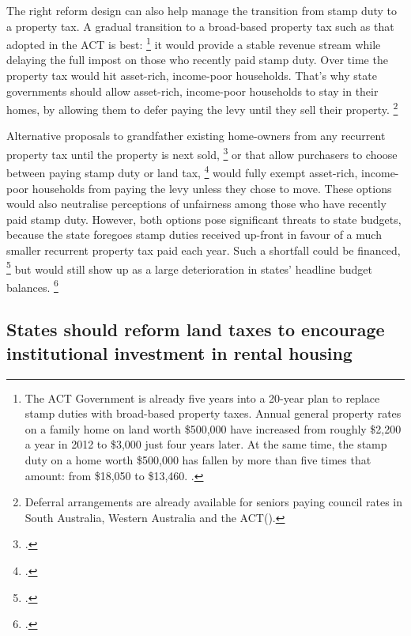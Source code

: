 The right reform design can also help manage the transition from stamp duty to a property tax.
A gradual transition to a broad-based property tax such as that adopted in the ACT is best:%
    \footnote{The ACT Government is already five years into a 20-year plan to replace stamp duties with broad-based property taxes.
    Annual general property rates on a family home on land worth \$500,000 have increased from roughly \$2,200 a year in 2012 to \$3,000 just four years later.
    At the same time, the stamp duty on a home worth \$500,000 has fallen by more than five times that amount: from \$18,050 to \$13,460. \textcite{DaleyCoates-2016-AFR-Following-ACT-landtax-boosts-growth}.}
it would provide a stable revenue stream while delaying the full impost on those who recently paid stamp duty.
Over time the property tax would hit asset-rich, income-poor households.
That's why state governments should allow asset-rich, income-poor households to stay in their homes, by allowing them to defer paying the levy until they sell their property.%
	\footnote{Deferral arrangements are already available for seniors paying council rates in South Australia, Western Australia and the ACT\@ (\textcite[][20]{DaleyCoates-2015-Property-taxes}).} 

Alternative proposals to grandfather existing home-owners from any recurrent property tax until the property is next sold,
    \footcite{McKellInstitute2016APlantoEndStampDuty}
or that allow purchasers to choose between paying stamp duty or land tax,%
    \footcite[269][]{HenryTaxReview2010-Part2-Detailed-analysis}
would fully exempt asset-rich, income-poor households from paying the levy unless they chose to move. These options would also neutralise perceptions of unfairness among those who have recently paid stamp duty.
However, both options pose significant threats to state budgets, because the state foregoes stamp duties received up-front in favour of a much smaller recurrent property tax paid each year.
Such a shortfall could be financed,%
    \footcite{PBO-2016-Financing-state-property-tax}
but would still show up as a large deterioration in states' headline budget balances.%
	\footcite{Coates2017PropertyTaxReformAdelaide}

\subsection{States should reform land taxes to encourage institutional investment in rental housing}\label{subsec:flattening-land-taxes}

